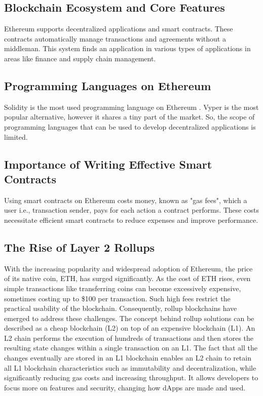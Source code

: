 \subsection{Blockchain Ecosystem and Core Features}
Ethereum supports decentralized applications and smart contracts. These contracts automatically manage transactions and agreements without a middleman. This system finds an application in various types of applications in areas like finance and supply chain management.

\subsection{Programming Languages on Ethereum}

Solidity is the most used programming language on Ethereum \cite{SolidityWidelyUsed}. Vyper is the most popular alternative, however it shares a tiny part of the market. So, the scope of programming languages that can be used to develop decentralized applications is limited.

\subsection{Importance of Writing Effective Smart Contracts}
Using smart contracts on Ethereum costs money, known as "gas fees", which a user i.e., transaction sender, pays for each action a contract performs. These costs necessitate efficient smart contracts to reduce expenses and improve performance.

\subsection{The Rise of Layer 2 Rollups}
With the increasing popularity and widespread adoption of Ethereum, the price of its native coin, ETH, has surged significantly. As the cost of ETH rises, even simple transactions like transferring coins can become excessively expensive, sometimes costing up to \$100 per transaction. Such high fees restrict the practical usability of the blockchain. Consequently, rollup blockchains have emerged to address these challenges. The concept behind rollup solutions can be described as a cheap blockchain (L2) on top of an expensive blockchain (L1). An L2 chain performs the execution of hundreds of transactions and then stores the resulting state changes within a single transaction on an L1. The fact that all the changes eventually are stored in an L1 blockchain enables an L2 chain to retain all L1 blockchain characteristics such as immutability and decentralization, while significantly reducing gas costs and increasing throughput. It allows developers to focus more on features and security, changing how dApps are made and used.


